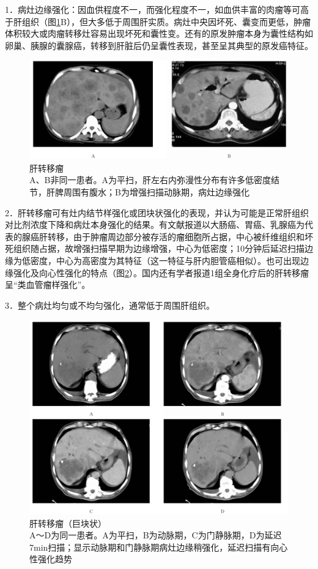 1．病灶边缘强化：因血供程度不一，而强化程度不一，如血供丰富的肉瘤等可高于肝组织（图\ref{fig11-6}B），但大多低于周围肝实质。病灶中央因坏死、囊变而更低，肿瘤体积较大或肉瘤转移灶容易出现坏死和囊性变。还有的原发肿瘤本身为囊性结构如卵巢、胰腺的囊腺癌，转移到肝脏后仍呈囊性表现，甚至呈其典型的原发癌特征。

\begin{figure}[!htbp]
 \centering
 \includegraphics[width=.7\textwidth,height=\textheight,keepaspectratio]{./images/Image00277.jpg}
 \captionsetup{justification=centering}
 \caption{肝转移瘤\\{\small A、B非同一患者。A为平扫，肝左右内弥漫性分布有许多低密度结节，肝脾周围有腹水；B为增强扫描动脉期，病灶边缘强化}}
 \label{fig11-6}
  \end{figure} 

2．肝转移瘤可有灶内结节样强化或团块状强化的表现，并认为可能是正常肝组织对比剂浓度下降和病灶本身强化的结果。有文献报道以大肠癌、胃癌、乳腺癌为代表的腺癌肝转移，由于肿瘤周边部分被存活的瘤细胞所占据，中心被纤维组织和坏死组织随占据，故增强扫描早期为边缘增强，中心为低密度；10分钟后延迟扫描边缘为低密度，中心为高密度为其特征（这一特征与肝内胆管癌相似）。也可出现边缘强化及向心性强化的特点（图\ref{fig11-7}）。国内还有学者报道1组全身化疗后的肝转移瘤呈“类血管瘤样强化”。

3．整个病灶均匀或不均匀强化，通常低于周围肝组织。

\begin{figure}[!htbp]
 \centering
 \includegraphics[width=.7\textwidth,height=\textheight,keepaspectratio]{./images/Image00278.jpg}
 \captionsetup{justification=centering}
 \caption{肝转移瘤（巨块状）\\{\small A～D为同一患者。A为平扫，B为动脉期，C为门静脉期，D为延迟7min扫描；显示动脉期和门静脉期病灶边缘稍强化，延迟扫描有向心性强化趋势}}
 \label{fig11-7}
  \end{figure} 

